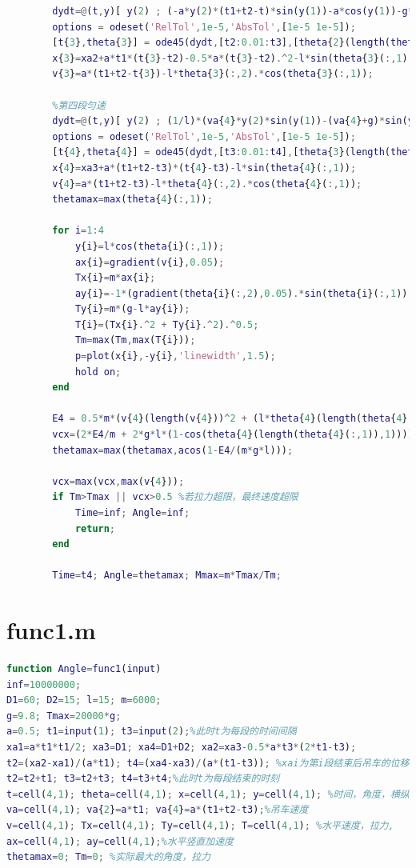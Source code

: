 \documentclass[withoutpreface,bwprint]{cumcmthesis} %
\begin{document}
\begin{appendices}
\begin{lstlisting}[language=matlab]
        %第三段减速
        dydt=@(t,y)[ y(2) ; (-a*y(2)*(t1+t2-t)*sin(y(1))-a*cos(y(1))-g*sin(y(1)))/l ];
        options = odeset('RelTol',1e-5,'AbsTol',[1e-5 1e-5]);
        [t{3},theta{3}] = ode45(dydt,[t2:0.01:t3],[theta{2}(length(theta{2}(:,1)),1) theta{2}(length(theta{2}(:,2)),2)],options);
        x{3}=xa2+a*t1*(t{3}-t2)-0.5*a*(t{3}-t2).^2-l*sin(theta{3}(:,1));
        v{3}=a*(t1+t2-t{3})-l*theta{3}(:,2).*cos(theta{3}(:,1));
        
        %第四段匀速
        dydt=@(t,y)[ y(2) ; (1/l)*(va{4}*y(2)*sin(y(1))-(va{4}+g)*sin(y(1))) ];
        options = odeset('RelTol',1e-5,'AbsTol',[1e-5 1e-5]);
        [t{4},theta{4}] = ode45(dydt,[t3:0.01:t4],[theta{3}(length(theta{3}(:,1)),1) theta{3}(length(theta{3}(:,2)),2)],options);
        x{4}=xa3+a*(t1+t2-t3)*(t{4}-t3)-l*sin(theta{4}(:,1));
        v{4}=a*(t1+t2-t3)-l*theta{4}(:,2).*cos(theta{4}(:,1));
        thetamax=max(theta{4}(:,1));
        
        for i=1:4
            y{i}=l*cos(theta{i}(:,1));
            ax{i}=gradient(v{i},0.05);
            Tx{i}=m*ax{i};
            ay{i}=-1*(gradient(theta{i}(:,2),0.05).*sin(theta{i}(:,1)) + cos(theta{i}(:,1)).*theta{i}(:,2).^2);
            Ty{i}=m*(g-l*ay{i});
            T{i}=(Tx{i}.^2 + Ty{i}.^2).^0.5;
            Tm=max(Tm,max(T{i}));
            p=plot(x{i},-y{i},'linewidth',1.5);
            hold on;
        end
        
        E4 = 0.5*m*(v{4}(length(v{4}))^2 + (l*theta{4}(length(theta{4}(:,2)),2)*sin(theta{4}(length(theta{4}(:,1)),1)))^2);
        vcx=(2*E4/m + 2*g*l*(1-cos(theta{4}(length(theta{4}(:,1)),1))))^0.5;
        thetamax=max(thetamax,acos(1-E4/(m*g*l)));
        
        vcx=max(vcx,max(v{4}));
        if Tm>Tmax || vcx>0.5 %若拉力超限，最终速度超限
            Time=inf; Angle=inf;
            return;
        end
        
        Time=t4; Angle=thetamax; Mmax=m*Tmax/Tm;
     \end{lstlisting}
    \section{func1.m}
    \begin{lstlisting}[language=matlab]
        function Angle=func1(input)
inf=10000000;
D1=60; D2=15; l=15; m=6000;
g=9.8; Tmax=20000*g; 
a=0.5; t1=input(1); t3=input(2);%此时t为每段的时间间隔
xa1=a*t1*t1/2; xa3=D1; xa4=D1+D2; xa2=xa3-0.5*a*t3*(2*t1-t3);
t2=(xa2-xa1)/(a*t1); t4=(xa4-xa3)/(a*(t1-t3)); %xai为第i段结束后吊车的位移
t2=t2+t1; t3=t2+t3; t4=t3+t4;%此时t为每段结束的时刻
t=cell(4,1); theta=cell(4,1); x=cell(4,1); y=cell(4,1); %时间，角度，横纵坐标
va=cell(4,1); va{2}=a*t1; va{4}=a*(t1+t2-t3);%吊车速度
v=cell(4,1); Tx=cell(4,1); Ty=cell(4,1); T=cell(4,1); %水平速度，拉力,
ax=cell(4,1); ay=cell(4,1);%水平竖直加速度
thetamax=0; Tm=0; %实际最大的角度，拉力


\end{lstlisting}
\end{appendices}
\end{document}
